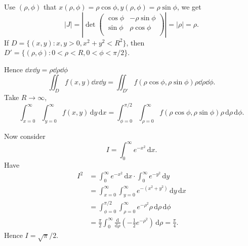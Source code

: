 \begin{example}
    Use $ (\rho,\phi) $ that $ x(\rho,\phi)=\rho \cos \phi,y(\rho,\phi)=\rho \sin \phi $, we get 
    \[
        |J| = \left| \det \begin{pmatrix}
            \cos \phi & -\rho \sin \phi \\
            \sin \phi & \rho \cos \phi \\
        \end{pmatrix} \right| = |\rho|=\rho.
    \]
    If $ D=\{(x,y):x,y>0, x^2+y^2<R^2\} $, then $ D'=\{(\rho,\phi):0<\rho<R,0<\phi<\pi/2\} $.
    \begin{center}
      \end{center}
      Hence $ \dd x\dd y=\rho\dd \rho\dd \phi $
      \[
          \iint_{D}f(x,y)\dd x\dd y = \iint_{D'}f(\rho \cos \phi,\rho \sin \phi)\rho \dd \rho\dd \phi.
      \]
      Take $ R\to \infty $,
      \[
          \int_{x=0}^{\infty} \int_{y=0}^{\infty} f(x,y) \,\mathrm{d}y \,\mathrm{d}x = \int_{\phi=0}^{\pi/2} \int_{\rho=0}^{\infty} f(\rho \cos \phi,\rho \sin \phi) \rho \,\mathrm{d}\rho \,\mathrm{d}\phi.
      \]

      Now consider 
      \[
          I = \int_{0}^{\infty} e^{-x^2} \,\mathrm{d}x.
      \]
      Have 
      \begin{align*}
          I^2 &= \int_{0}^{\infty} e^{-x^2} \,\mathrm{d}x \cdot \int_{0}^{\infty} e^{-y^2} \,\mathrm{d}y \\ 
          &= \int_{x=0}^{\infty} \int_{y=0}^{\infty} e^{-(x^2+y^2)} \,\mathrm{d}y \,\mathrm{d}x\\ 
          &= \int_{\phi=0}^{\pi/2} \int_{\rho=0}^{\infty} e^{-\rho^2} \rho \,\mathrm{d}\rho \,\mathrm{d}\phi \\
          &= \frac{\pi}{2} \int_{0}^{\infty} \frac{\mathrm{d}}{\mathrm{d}\rho}\left( -\frac{1}{2}e^{-\rho^2} \right)  \,\mathrm{d}\rho = \frac{\pi}{4}.
      \end{align*}
      Hence $ I=\sqrt{\pi}/2 $.
\end{example}

